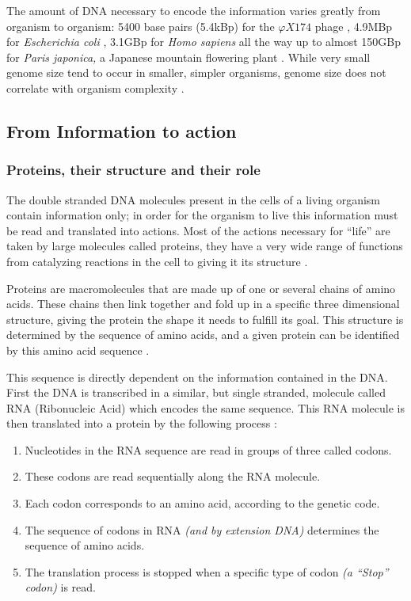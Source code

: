 \documentclass[
  11pt,
  twoside,
  BCOR=10mm,
  listof=totoc]{scrbook}
\providecommand{\tightlist}{%
  \setlength{\itemsep}{0pt}\setlength{\parskip}{0pt}}
\begin{document}
The amount of DNA necessary to encode the information varies greatly from organism to organism: 5400 base pairs (5.4kBp) for the \(\varphi X174\) phage \autocite{sangerNucleotideSequenceBacteriophage1977}, 4.9MBp for \emph{Escherichia coli} \autocite{archer2011}, 3.1GBp for \emph{Homo sapiens} \autocite{nurk2022} all the way up to almost 150GBp for \emph{Paris japonica,} a Japanese mountain flowering plant \autocite{pellicer2010}. While very small genome size tend to occur in smaller, simpler organisms, genome size does not correlate with organism complexity \autocite{macgregor2001}.

\hypertarget{from-information-to-action}{%
\subsection{From Information to action}\label{from-information-to-action}}

\hypertarget{proteins-their-structure-and-their-role}{%
\subsubsection{Proteins, their structure and their role}\label{proteins-their-structure-and-their-role}}

The double stranded DNA molecules present in the cells of a living organism contain information only; in order for the organism to live this information must be read and translated into actions. Most of the actions necessary for ``life'' are taken by large molecules called proteins, they have a very wide range of functions from catalyzing reactions in the cell to giving it its structure \autocite{alberts2002}.

Proteins are macromolecules that are made up of one or several chains of amino acids. These chains then link together and fold up in a specific three dimensional structure, giving the protein the shape it needs to fulfill its goal. This structure is determined by the sequence of amino acids, and a given protein can be identified by this amino acid sequence \autocite{alberts2002}.

This sequence is directly dependent on the information contained in the DNA. First the DNA is transcribed in a similar, but single stranded, molecule called RNA (Ribonucleic Acid) which encodes the same sequence. This RNA molecule is then translated into a protein by the following process \autocite{crick1961}:

\begin{enumerate}
\def\labelenumi{\arabic{enumi}.}
\tightlist
\item
  Nucleotides in the RNA sequence are read in groups of three called codons.
\item
  These codons are read sequentially along the RNA molecule.
\item
  Each codon corresponds to an amino acid, according to the genetic code.
\item
  The sequence of codons in RNA \emph{(and by extension DNA)} determines the sequence of amino acids.
\item
  The translation process is stopped when a specific type of codon \emph{(a ``Stop'' codon)} is read.
\end{enumerate}
\end{document}
